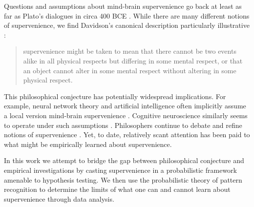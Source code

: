 \documentclass{article}
\begin{document}

\newpage

\noindent Questions and assumptions about mind-brain supervenience go back at least as far as Plato's dialogues in circa 400 BCE \cite{Plato97}.  While there are many different notions of supervenience, we find Davidson's canonical description particularly illustrative \cite{Davidson70}:
\begin{quotation}
 supervenience might be taken to mean that there cannot be two events alike in all physical respects but differing in some mental respect, or that an object cannot alter in some mental respect without altering in some physical respect.
\end{quotation}
This philosophical conjecture has potentially widespread implications.  
For example, neural network theory and artificial intelligence often implicitly assume 
a local version mind-brain supervenience 
\cite{Haykin2008,Ripley2008}. Cognitive neuroscience similarly seems to operate under such assumptions
\cite{Fodor1998, Gazzaniga2008}.  Philosophers continue to debate and refine notions of supervenience 
\cite{Kim2007}.  
Yet, to date, relatively scant attention has been paid to what might be empirically learned about supervenience.  

In this work we attempt to bridge the gap between philosophical conjecture and empirical investigations by casting supervenience in a probabilistic framework amenable to hypothesis testing. 
We then use the probabilistic theory of pattern recognition to determine
the limits of what one can and cannot learn about supervenience through data analysis.  
\end{document}
